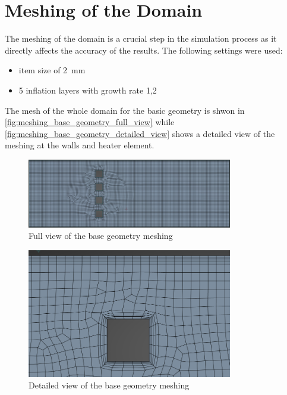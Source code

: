\chapter{Meshing of the Domain}
\label{chapter:meshing}

The meshing of the domain is a crucial step in the simulation process as it directly affects the accuracy of the results. 
The following settings were used:
\begin{itemize}
    \item item size of \qty{2}{\milli\meter}
    \item 5 inflation layers with growth rate 1,2
\end{itemize}

The mesh of the whole domain for the basic geometry is shwon in \autoref{fig:meshing_base_geometry_full_view} while \autoref{fig:meshing_base_geometry_detailed_view} shows a detailed view of the meshing at the walls and heater element.


\begin{figure}[htbp]   
    \centering
    \includegraphics[width=0.8\textwidth]{img/meshing_base_geometry_full_view}
    \caption{Full view of the base geometry meshing}
    \label{fig:meshing_base_geometry_full_view}
\end{figure}


\begin{figure}[htbp]
    \centering
    \includegraphics[width=0.8\textwidth]{img/meshing_base_geometry_detailed_view}
    \caption{Detailed view of the base geometry meshing}
    \label{fig:meshing_base_geometry_detailed_view}
\end{figure}

